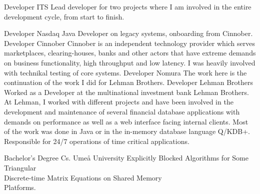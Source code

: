 \documentclass[9pt]{developercv} %
\begin{document}
\begin{entrylist}
        {Developer}
        {ITS}
        {Lead developer for two projects where I am involved 
		in the entire development cycle, from start to finish.}

        {Developer}    
        {Nasdaq}
        {Java Developer on legacy systems, onboarding from Cinnober.}
		{Developer}
		{Cinnober}
		{Cinnober is an independent technology provider which serves marketplaces, clearing-houses,
        banks and other actors that have extreme demands on business functionality, high throughput
         and low latency. I was heavily involved with technikal testing of core systems.}
		{Developer}
		{Nomura}
		{The work here is the continuation of the work I did for Lehman Brothers.}
		{Developer}
		{Lehman Brothers}
        {Worked as a Developer at the multinational investment
        bank Lehman Brothers.  At Lehman, I worked
        with different projects and have been involved in the development
        and  maintenance of several financial database applications with
         demands on performance as well as a web interface facing 
         internal clients. Most of the work was done in Java or 
         in the in-memory database language Q/KDB+. \\
         Responsible for 24/7 operations of time critical applications.} \raggedright
		\end{entrylist}

\vspace{-12pt}
\raggedright
\begin{entrylist}
		{Bachelor's Degree Cs.}
		{Umeå University}
		{Explicitly Blocked Algorithms for Some 
        Triangular \\ Discrete-time Matrix Equations on 
        Shared Memory \\ Platforms.}
\end{entrylist}
\end{document}
